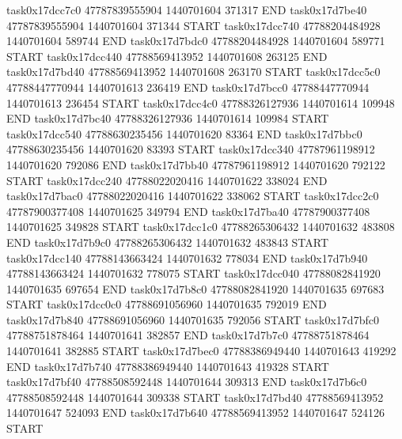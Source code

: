 task0x17dcc7c0 47787839555904          1440701604               371317  END
task0x17d7be40 47787839555904          1440701604               371344  START
task0x17dcc740 47788204484928          1440701604               589744  END
task0x17d7bdc0 47788204484928          1440701604               589771  START
task0x17dcc440 47788569413952          1440701608               263125  END
task0x17d7bd40 47788569413952          1440701608               263170  START
task0x17dcc5c0 47788447770944          1440701613               236419  END
task0x17d7bcc0 47788447770944          1440701613               236454  START
task0x17dcc4c0 47788326127936          1440701614               109948  END
task0x17d7bc40 47788326127936          1440701614               109984  START
task0x17dcc540 47788630235456          1440701620                83364  END
task0x17d7bbc0 47788630235456          1440701620                83393  START
task0x17dcc340 47787961198912          1440701620               792086  END
task0x17d7bb40 47787961198912          1440701620               792122  START
task0x17dcc240 47788022020416          1440701622               338024  END
task0x17d7bac0 47788022020416          1440701622               338062  START
task0x17dcc2c0 47787900377408          1440701625               349794  END
task0x17d7ba40 47787900377408          1440701625               349828  START
task0x17dcc1c0 47788265306432          1440701632               483808  END
task0x17d7b9c0 47788265306432          1440701632               483843  START
task0x17dcc140 47788143663424          1440701632               778034  END
task0x17d7b940 47788143663424          1440701632               778075  START
task0x17dcc040 47788082841920          1440701635               697654  END
task0x17d7b8c0 47788082841920          1440701635               697683  START
task0x17dcc0c0 47788691056960          1440701635               792019  END
task0x17d7b840 47788691056960          1440701635               792056  START
task0x17d7bfc0 47788751878464          1440701641               382857  END
task0x17d7b7c0 47788751878464          1440701641               382885  START
task0x17d7bec0 47788386949440          1440701643               419292  END
task0x17d7b740 47788386949440          1440701643               419328  START
task0x17d7bf40 47788508592448          1440701644               309313  END
task0x17d7b6c0 47788508592448          1440701644               309338  START
task0x17d7bd40 47788569413952          1440701647               524093  END
task0x17d7b640 47788569413952          1440701647               524126  START
